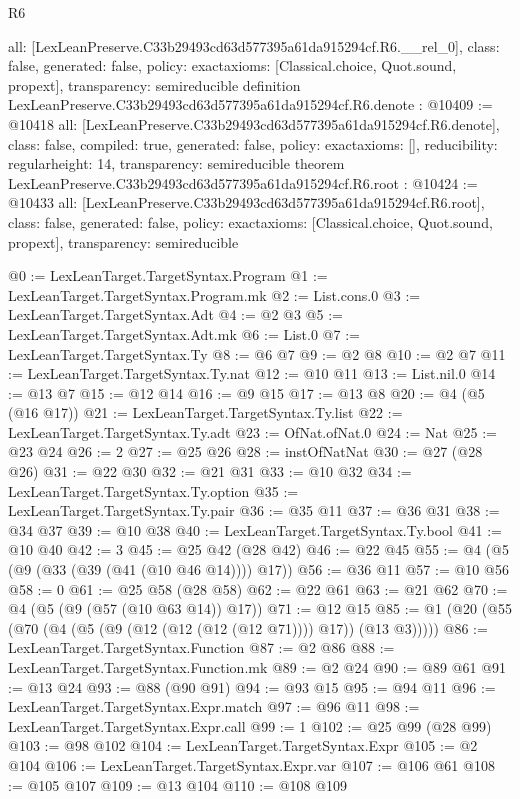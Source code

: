 \begin{lexlean}{R6}
\begin{coremodule}
{  all: [LexLeanPreserve.C33b29493cd63d577395a61da915294cf.R6.__rel_0],
  class: false,
  generated: false,
  policy: exact{axioms: [Classical.choice, Quot.sound, propext]},
  transparency: semireducible
}
definition LexLeanPreserve.C33b29493cd63d577395a61da915294cf.R6.denote : @10409 := @10418 {
  all: [LexLeanPreserve.C33b29493cd63d577395a61da915294cf.R6.denote],
  class: false,
  compiled: true,
  generated: false,
  policy: exact{axioms: []},
  reducibility: regular{height: 14},
  transparency: semireducible
}
theorem LexLeanPreserve.C33b29493cd63d577395a61da915294cf.R6.root : @10424 := @10433 {
  all: [LexLeanPreserve.C33b29493cd63d577395a61da915294cf.R6.root],
  class: false,
  generated: false,
  policy: exact{axioms: [Classical.choice, Quot.sound, propext]},
  transparency: semireducible
}

@0 := LexLeanTarget.TargetSyntax.Program
@1 := LexLeanTarget.TargetSyntax.Program.mk
@2 := List.cons.{0}
@3 := LexLeanTarget.TargetSyntax.Adt
@4 := @2 @3
@5 := LexLeanTarget.TargetSyntax.Adt.mk
@6 := List.{0}
@7 := LexLeanTarget.TargetSyntax.Ty
@8 := @6 @7
@9 := @2 @8
@10 := @2 @7
@11 := LexLeanTarget.TargetSyntax.Ty.nat
@12 := @10 @11
@13 := List.nil.{0}
@14 := @13 @7
@15 := @12 @14
@16 := @9 @15
@17 := @13 @8
@20 := @4 (@5 (@16 @17))
@21 := LexLeanTarget.TargetSyntax.Ty.list
@22 := LexLeanTarget.TargetSyntax.Ty.adt
@23 := OfNat.ofNat.{0}
@24 := Nat
@25 := @23 @24
@26 := 2
@27 := @25 @26
@28 := instOfNatNat
@30 := @27 (@28 @26)
@31 := @22 @30
@32 := @21 @31
@33 := @10 @32
@34 := LexLeanTarget.TargetSyntax.Ty.option
@35 := LexLeanTarget.TargetSyntax.Ty.pair
@36 := @35 @11
@37 := @36 @31
@38 := @34 @37
@39 := @10 @38
@40 := LexLeanTarget.TargetSyntax.Ty.bool
@41 := @10 @40
@42 := 3
@45 := @25 @42 (@28 @42)
@46 := @22 @45
@55 := @4 (@5 (@9 (@33 (@39 (@41 (@10 @46 @14)))) @17))
@56 := @36 @11
@57 := @10 @56
@58 := 0
@61 := @25 @58 (@28 @58)
@62 := @22 @61
@63 := @21 @62
@70 := @4 (@5 (@9 (@57 (@10 @63 @14)) @17))
@71 := @12 @15
@85 := @1 (@20 (@55 (@70 (@4 (@5 (@9 (@12 (@12 (@12 (@12 @71)))) @17)) (@13 @3)))))
@86 := LexLeanTarget.TargetSyntax.Function
@87 := @2 @86
@88 := LexLeanTarget.TargetSyntax.Function.mk
@89 := @2 @24
@90 := @89 @61
@91 := @13 @24
@93 := @88 (@90 @91)
@94 := @93 @15
@95 := @94 @11
@96 := LexLeanTarget.TargetSyntax.Expr.match
@97 := @96 @11
@98 := LexLeanTarget.TargetSyntax.Expr.call
@99 := 1
@102 := @25 @99 (@28 @99)
@103 := @98 @102
@104 := LexLeanTarget.TargetSyntax.Expr
@105 := @2 @104
@106 := LexLeanTarget.TargetSyntax.Expr.var
@107 := @106 @61
@108 := @105 @107
@109 := @13 @104
@110 := @108 @109

\end{coremodule}
\end{lexlean}
